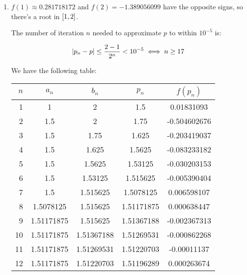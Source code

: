 \documentclass[../../Assignments.tex]{subfiles}
\begin{document}
\begin{solution}
    \begin{enumerate}
        \item \(f(1) \approx \num{0.281718172}\) and \(f(2) =
            \num{-1.389056099}\) have the opposite signs, so there's a root in
            \(\interval{1}{2}\).

            The number of iteration \(n\) needed to approximate \(p\) to within
            \(10^{-5}\) is:

            \[\abs{p_n - p} \leq \frac{2 - 1}{2^n} < 10^{-5} \iff n \geq 17\]

            We have the following table:

            \begin{longtable}{r S[table-format=1.8] S[table-format=1.8] S[table-format=1.8] S[table-format=-1.9]}
                \toprule
                \(n\)  &   {\(a_n\)}   &   {\(b_n\)}   &   {\(p_n\)}   &  {\(f(p_n)\)}  \\
                  &  1            &  2            &  1.5          &   0.01831093   \\
                    2  &  1.5          &  2            &  1.75         &  -0.504602676  \\
                    3  &  1.5          &  1.75         &  1.625        &  -0.203419037  \\
                    4  &  1.5          &  1.625        &  1.5625       &  -0.083233182  \\
                    5  &  1.5          &  1.5625       &  1.53125      &  -0.030203153  \\
                    6  &  1.5          &  1.53125      &  1.515625     &  -0.005390404  \\
                    7  &  1.5          &  1.515625     &  1.5078125    &   0.006598107  \\
                    8  &  1.5078125    &  1.515625     &  1.51171875   &   0.000638447  \\
                    9  &  1.51171875   &  1.515625     &  1.51367188   &  -0.002367313  \\
                   10  &  1.51171875   &  1.51367188   &  1.51269531   &  -0.000862268  \\
                   11  &  1.51171875   &  1.51269531   &  1.51220703   &  -0.00011137   \\
                   12  &  1.51171875   &  1.51220703   &  1.51196289   &   0.000263674  \\

\end{longtable}
\end{enumerate}
\end{solution}
\end{document}
